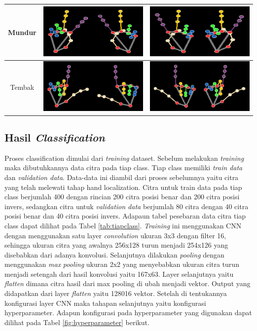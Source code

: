 \begin{table}[H]
\begin{tabular}{|c|c|c|}
  Mundur & \includegraphics[width=0.3\linewidth]{gambar/Mundur (1).png} & \includegraphics[width=0.3\linewidth]{gambar/MundurI (1).png} \\ \hline
  Tembak & \includegraphics[width=0.3\linewidth]{gambar/Tembak (1).png} & \includegraphics[width=0.3\linewidth]{gambar/TembakI (1).png} \\ \hline
  \end{tabular}
\end{table}




\subsection{Hasil \emph{Classification}}
Proses classification dimulai dari \emph{training} dataset. Sebelum melakukan \emph{training} maka dibutuhkannya data citra pada tiap class. Tiap class memiliki \emph{train data} dan \emph{validation data}. Data-data ini diambil dari proses sebelumnya yaitu citra yang telah melewati tahap hand localization. Citra untuk train data pada tiap class berjumlah 400 dengan rincian 200 citra posisi benar dan 200 citra posisi invers, sedangkan citra untuk \emph{validation data} berjumlah 80 citra dengan 40 citra posisi benar dan 40 citra posisi invers. Adapaun tabel pesebaran data citra tiap class dapat dilihat pada Tabel \ref{tab:tiapclass}. \emph{Training} ini menggunakan CNN dengan menggunakan satu layer \emph{convolution} ukuran 3x3 dengan filter 16, sehingga ukuran citra yang awalnya 256x128 turun menjadi 254x126 yang disebabkan dari adanya konvolusi. Selanjutnya dilakukan \emph{pooling} dengan menggunakan \emph{max} \emph{pooling} ukuran 2x2 yang menyebabkan ukuran citra turun menjadi setengah dari hasil konvolusi yaitu 167x63. Layer selanjutnya yaitu \emph{flatten} dimana citra hasil dari max pooling di ubah menjadi vektor. Output yang didapatkan dari layer \emph{flatten} yaitu 128016 vektor.  Setelah di tentukannya konfigurasi layer CNN maka tahapan selanjutnya yaitu konfigurasi hyperparameter. Adapun konfigurasi pada hyperparameter yang digunakan dapat dilihat pada Tabel \ref{fig:hyperparameter} berikut.

